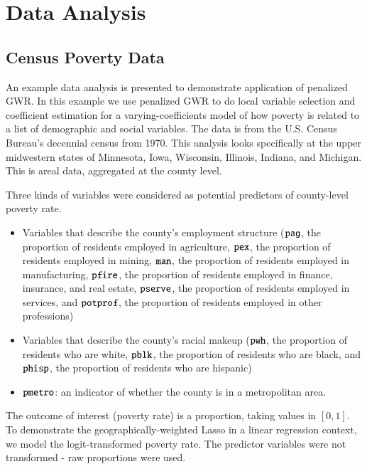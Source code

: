 \documentclass[authoryear, review, 11pt]{elsarticle}
\begin{document}
	


			
\section{Data Analysis\label{section:data-analysis}}
	\subsection{Census Poverty Data}
	An example data analysis is presented to demonstrate application of penalized GWR. In this example we use penalized GWR to do local variable selection and coefficient estimation for a  varying-coefficients model of how poverty is related to a list of demographic and social variables. The data is from the U.S. Census Bureau's decennial census  from 1970. This analysis looks specifically at the upper midwestern states of Minnesota, Iowa, Wisconsin, Illinois, Indiana, and Michigan. This is areal data, aggregated at the county level.
	
	Three kinds of variables  were considered as potential predictors of county-level poverty rate.
	\begin{itemize}
		\item Variables that describe the county's employment structure ($\verb!pag!$, the proportion of residents employed in agriculture, $\verb!pex!$, the proportion of residents employed in mining, $\verb!man!$, the proportion of residents employed in manufacturing, $\verb!pfire!$, the proportion of residents employed in finance, insurance, and real estate, $\verb!pserve!$, the proportion of residents employed in services, and $\verb!potprof!$, the proportion of residents employed in other professions)\\
		\item Variables that describe the county's racial makeup ($\verb!pwh!$, the proportion of residents who are white, $\verb!pblk!$, the proportion of residents who are black, and $\verb!phisp!$, the proportion of residents who are hispanic)\\
		\item $\verb!pmetro!$: an indicator of whether the county is in a metropolitan area.
	\end{itemize}
	The outcome of interest (poverty rate) is a proportion, taking values in $[0,1]$. To demonstrate the geographically-weighted Lasso in a linear regression context, we model the logit-transformed poverty rate. The predictor variables were not transformed - raw proportions were used.
	
\end{document}
